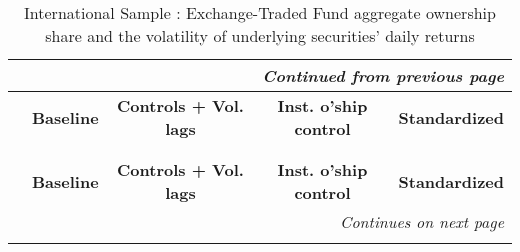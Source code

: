 {\scriptsize\tabcolsep=3pt
\begin{longtable}{lcccc}
\multicolumn{5}{r}{\textit{Continued from previous page}}\\
\toprule
& \textbf{Baseline}  & \textbf{Controls + Vol. lags} & \textbf{Inst. o'ship control} & \textbf{Standardized}  \\
\midrule
\endhead
\caption{International Sample : Exchange-Traded Fund aggregate ownership share and the volatility of underlying securities' daily returns}\\
\label{tab:Volatility:Intl:Comp}\\
\toprule
& \textbf{Baseline}  & \textbf{Controls + Vol. lags} & \textbf{Inst. o'ship control} & \textbf{Standardized}  \\
\midrule
\endfirsthead
\bottomrule
\multicolumn{5}{r}{\textit{Continues on next page}}\\
\endfoot
\bottomrule
\endlastfoot


\end{longtable}}
